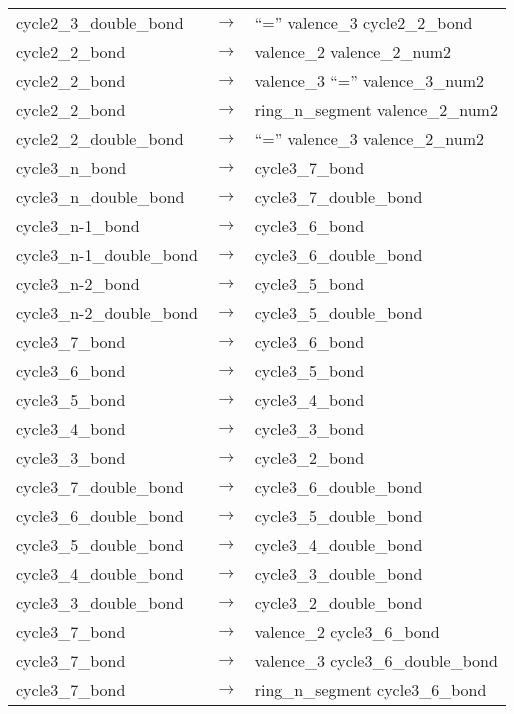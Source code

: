 \documentclass[../Document.tex]{subfiles}
\begin{document}
\begin{longtable}{m{} p{} p{}}
    cycle2\_3\_double\_bond & $\rightarrow$ & ``='' valence\_3 cycle2\_2\_bond \\
    cycle2\_2\_bond & $\rightarrow$ & valence\_2 valence\_2\_num2 \\
    cycle2\_2\_bond & $\rightarrow$ & valence\_3 ``='' valence\_3\_num2 \\
    cycle2\_2\_bond & $\rightarrow$ & ring\_n\_segment valence\_2\_num2 \\
    cycle2\_2\_double\_bond & $\rightarrow$ & ``='' valence\_3 valence\_2\_num2 \\
    cycle3\_n\_bond & $\rightarrow$ & cycle3\_7\_bond \\
    cycle3\_n\_double\_bond & $\rightarrow$ & cycle3\_7\_double\_bond \\
    cycle3\_n-1\_bond & $\rightarrow$ & cycle3\_6\_bond \\
    cycle3\_n-1\_double\_bond & $\rightarrow$ & cycle3\_6\_double\_bond \\
    cycle3\_n-2\_bond & $\rightarrow$ & cycle3\_5\_bond \\
    cycle3\_n-2\_double\_bond & $\rightarrow$ & cycle3\_5\_double\_bond \\
    cycle3\_7\_bond & $\rightarrow$ & cycle3\_6\_bond \\
    cycle3\_6\_bond & $\rightarrow$ & cycle3\_5\_bond \\
    cycle3\_5\_bond & $\rightarrow$ & cycle3\_4\_bond \\
    cycle3\_4\_bond & $\rightarrow$ & cycle3\_3\_bond \\
    cycle3\_3\_bond & $\rightarrow$ & cycle3\_2\_bond \\
    cycle3\_7\_double\_bond & $\rightarrow$ & cycle3\_6\_double\_bond \\
    cycle3\_6\_double\_bond & $\rightarrow$ & cycle3\_5\_double\_bond \\
    cycle3\_5\_double\_bond & $\rightarrow$ & cycle3\_4\_double\_bond \\
    cycle3\_4\_double\_bond & $\rightarrow$ & cycle3\_3\_double\_bond \\
    cycle3\_3\_double\_bond & $\rightarrow$ & cycle3\_2\_double\_bond \\
    cycle3\_7\_bond & $\rightarrow$ & valence\_2 cycle3\_6\_bond \\
    cycle3\_7\_bond & $\rightarrow$ & valence\_3 cycle3\_6\_double\_bond \\
    cycle3\_7\_bond & $\rightarrow$ & ring\_n\_segment cycle3\_6\_bond \\

\end{longtable}
\end{document}
